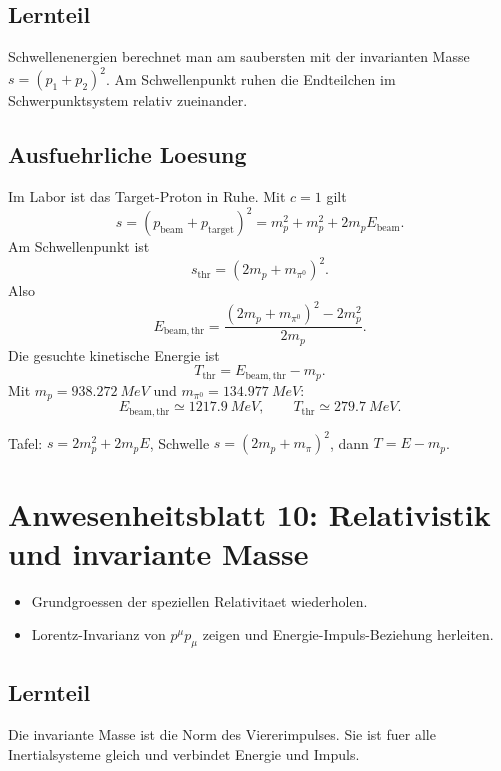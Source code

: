 \documentclass[11pt,a4paper]{scrartcl}
\begin{document}
\subsection{Lernteil}\begin{learningbox}Schwellenenergien berechnet man am saubersten mit der invarianten Masse \(s=(p_1+p_2)^2\). Am Schwellenpunkt ruhen die Endteilchen im Schwerpunktsystem relativ zueinander.\end{learningbox}
\subsection{Ausfuehrliche Loesung}
\begin{calculationbox}
Im Labor ist das Target-Proton in Ruhe. Mit \(c=1\) gilt
\[s=(p_{\mathrm{beam}}+p_{\mathrm{target}})^2=m_p^2+m_p^2+2m_pE_{\mathrm{beam}}.\]
Am Schwellenpunkt ist
\[s_{\mathrm{thr}}=(2m_p+m_{\pi^0})^2.\]
Also
\[E_{\mathrm{beam,thr}}=\frac{(2m_p+m_{\pi^0})^2-2m_p^2}{2m_p}.\]
Die gesuchte kinetische Energie ist
\[T_{\mathrm{thr}}=E_{\mathrm{beam,thr}}-m_p.\]
Mit \(m_p=\SI{938.272}{MeV}\) und \(m_{\pi^0}=\SI{134.977}{MeV}\):
\[E_{\mathrm{beam,thr}}\simeq\SI{1217.9}{MeV},\qquad \boxed{T_{\mathrm{thr}}\simeq\SI{279.7}{MeV}}.\]
\end{calculationbox}
\begin{talkbox}Tafel: \(s=2m_p^2+2m_pE\), Schwelle \(s=(2m_p+m_\pi)^2\), dann \(T=E-m_p\).\end{talkbox}


\section{Anwesenheitsblatt 10: Relativistik und invariante Masse}
\begin{taskbox}\begin{itemize}\item Grundgroessen der speziellen Relativitaet wiederholen.\item Lorentz-Invarianz von \(p^\mu p_\mu\) zeigen und Energie-Impuls-Beziehung herleiten.\end{itemize}\end{taskbox}
\subsection{Lernteil}\begin{learningbox}Die invariante Masse ist die Norm des Viererimpulses. Sie ist fuer alle Inertialsysteme gleich und verbindet Energie und Impuls.\end{learningbox}
\end{document}
